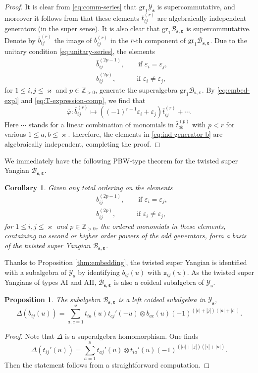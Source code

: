 \documentclass[11pt,reqno]{amsart}
\numberwithin{equation}{section}
\newtheorem{prop}[thm]{Proposition}
\newtheorem{cor}[thm]{Corollary}
\theoremstyle{definition}
\theoremstyle{remark}
\newcommand{\beq}{\begin{equation}}
\newcommand{\eeq}{\end{equation}}
\newcommand{\lle}{\leqslant}
\newcommand{\YMN}{{\mathscr{Y}_{\bm s}}}
\newcommand{\BMN}{{\mathscr{B}_{\bm s,\bm \ve}}}
\newcommand{\ka}{\varkappa}
\newcommand{\ve}{\varepsilon}
\begin{document}
\begin{proof}
It is clear from \eqref{eq:comm-series} that $\mathrm{gr}_1\YMN$ is supercommutative, and moreover it follows from \cite[Theorem 1]{Gow2007gauss} that these elements $\bar t_{ij}^{(r)}$ are algebraically independent generators (in the super sense). It is also clear that $\mathrm{gr}_1\BMN$ is supercommutative. Denote by $\bar b_{ij}^{(r)}$ the image of $b_{ij}^{(r)}$ in the $r$-th component of $\mathrm{gr}_1\BMN$. Due to the unitary condition \eqref{eq:unitary-series}, the elements
\beq\label{eq:ind-generator-b}
\begin{split}
&\bar b_{ij}^{(2p-1)}, \qquad  \text{if }\ve_i=\ve_j,\\
&\bar b_{ij}^{(2p)},  \qquad\quad \text{if }\ve_i\ne\ve_j,
\end{split}
\eeq
for $1\lle i,j\lle \ka$ and $p\in\mathbb Z_{>0}$, generate the superalgebra $\mathrm{gr}_1 \BMN$. By \eqref{eq:embed-expl} and \eqref{eq:T-expression-comp}, we find that
\beq\label{eq:graded-generators}
\overline{\varphi}:\bar b_{ij}^{(r)}\mapsto ((-1)^{r-1}\ve_i+\ve_j)\bar t_{ij}^{(r)}+\cdots.
\eeq
Here $\cdots$ stands for a linear combination of monomials in $\bar t_{ab}^{(p)}$ with $p<r$ for various $1\lle a,b\lle \ka$. therefore, the elements in \eqref{eq:ind-generator-b} are algebraically independent, completing the proof.
\end{proof}

We immediately have the following PBW-type theorem for the twisted super Yangian $\BMN$.
\begin{cor}\label{cor:PBW}
Given any total ordering on the elements
\beq
\begin{split}
& b_{ij}^{(2p-1)}, \qquad  \text{if }\ve_i=\ve_j,\\
& b_{ij}^{(2p)},  \qquad\quad \text{if }\ve_i\ne\ve_j,
\end{split}
\eeq
for $1\lle i,j\lle \ka$ and $p\in\mathbb Z_{>0}$, the ordered monomials in these elements, containing no second or higher
order powers of the odd generators, form a basis of the twisted super Yangian $\BMN$.
\end{cor}

Thanks to Proposition \ref{thm:embedding}, the twisted super Yangian is identified with a subalgebra of $\YMN$ by identifying $b_{ij}(u)$ with $\mathtt s_{ij}(u)$. As the twisted super Yangians of types AI and AII, $\BMN$ is also a coideal subalgebra of $\YMN$.
\begin{prop}\label{prop:coproduct}
The subalgebra $\BMN$ is a left coideal subalgebra in $\YMN$,
\beq\label{eq:b-copro-in-t}
\Delta(b_{ij}(u))=\sum_{a,c=1}^\ka t_{ia}(u)t_{cj}'(-u)\otimes b_{ac}(u)(-1)^{(|c|+|j|)(|a|+|c|)}.
\eeq
\end{prop}
\begin{proof}
Note that $\Delta$ is a superalgebra homomorphism. One finds
$$
\Delta(t_{ij}'(u))=\sum_{a=1}^\ka t_{aj}'(u)\otimes t_{ia}'(u)(-1)^{(|a|+|j|)(|i|+|a|)}.
$$
Then the statement follows from a straightforward computation.
\end{proof}
\end{document}
